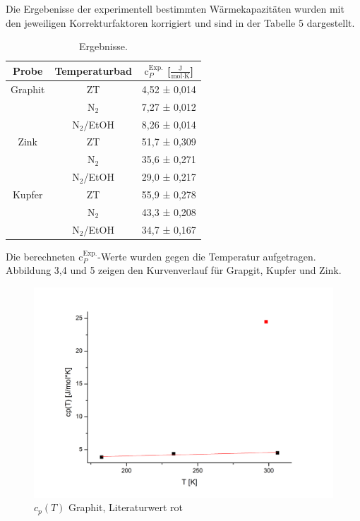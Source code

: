 \documentclass[12pt,a4paper,titlepage,headinclude,bibtotoc]{scrartcl}
\begin{document}
Die Ergebenisse der experimentell bestimmten Wärmekapazitäten wurden mit den jeweiligen Korrekturfaktoren korrigiert und sind in der Tabelle 5 dargestellt.
\begin{table}[h!]
\centering
\caption{Ergebnisse.}
\begin{tabular}{c|c|c}
Probe&Temperaturbad&$\text{c}_P^{\text{Exp.}}$ [$\frac{\text{J}}{\text{mol}\cdot\text{K}}$]\\
\hline
Graphit& ZT&4,52 ± 0,014 \\
\hline
&$\text{N}_2$&7,27 ± 0,012 \\
\hline
&$\text{N}_2$/EtOH&8,26 ± 0,014 \\
\hline
Zink &ZT& 51,7 ± 0,309\\
\hline
&$\text{N}_2$& 35,6 ± 0,271\\
\hline
&$\text{N}_2$/EtOH& 29,0 ± 0,217\\
\hline
Kupfer &ZT&55,9 ± 0,278\\
\hline
&$\text{N}_2$&43,3 ± 0,208\\
\hline
&$\text{N}_2$/EtOH& 34,7 ± 0,167\\
\end{tabular}
\end{table}
\FloatBarrier
Die berechneten $\text{c}_P^{\text{Exp.}}$-Werte wurden gegen die Temperatur aufgetragen. Abbildung 3,4 und 5 zeigen den Kurvenverlauf für Grapgit, Kupfer und Zink.
\begin{figure} [h!]
\begin{center}
\includegraphics[scale=0.5]{cp(T)GraphitNeu.png} \end{center}
\caption{$c_p(T)$ Graphit, Literaturwert rot}
\end{figure} 
\FloatBarrier
\end{document}
